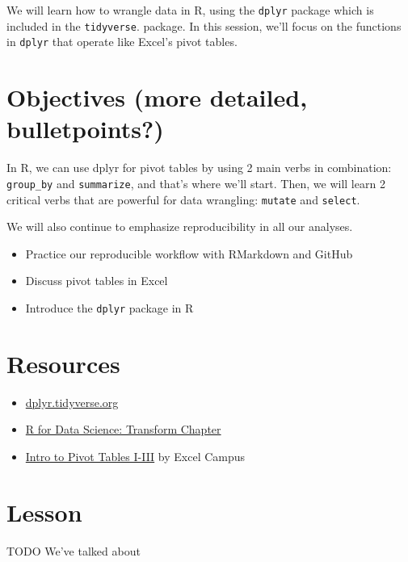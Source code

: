 \documentclass[]{book}
\providecommand{\tightlist}{%
  \setlength{\itemsep}{0pt}\setlength{\parskip}{0pt}}
\begin{document}
We will learn how to wrangle data in R, using the \texttt{dplyr} package which is included in the \texttt{tidyverse}. package. In this session, we'll focus on the functions in \texttt{dplyr} that operate like Excel's pivot tables.

\hypertarget{objectives-more-detailed-bulletpoints-2}{%
\section{Objectives (more detailed, bulletpoints?)}\label{objectives-more-detailed-bulletpoints-2}}

In R, we can use dplyr for pivot tables by using 2 main verbs in combination: \texttt{group\_by} and \texttt{summarize}, and that's where we'll start. Then, we will learn 2 critical verbs that are powerful for data wrangling: \texttt{mutate} and \texttt{select}.

We will also continue to emphasize reproducibility in all our analyses.

\begin{itemize}
\tightlist
\item
  Practice our reproducible workflow with RMarkdown and GitHub
\item
  Discuss pivot tables in Excel
\item
  Introduce the \texttt{dplyr} package in R
\end{itemize}

\hypertarget{resources-5}{%
\section{Resources}\label{resources-5}}

\begin{itemize}
\tightlist
\item
  \href{https://dplyr.tidyverse.org/}{dplyr.tidyverse.org}
\item
  \href{https://r4ds.had.co.nz/transform.html}{R for Data Science: Transform Chapter}
\item
  \href{https://youtu.be/g530cnFfk8Y}{Intro to Pivot Tables I-III} by Excel Campus
\end{itemize}

\hypertarget{lesson-1}{%
\section{Lesson}\label{lesson-1}}

TODO
We've talked about
\end{document}
